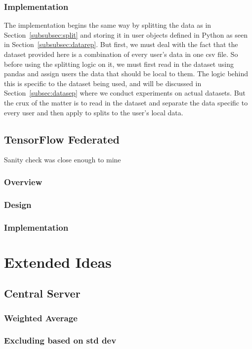 \documentclass[12pt]{article}
\begin{document}
\subsubsection{Implementation}
The implementation begins the same way by splitting the data as in Section~\ref{subsubsec:split} and storing it in user objects defined in Python as seen in Section~\ref{subsubsec:datarep}. But first, we must deal with the fact that the dataset provided here is a combination of every user's data in one csv file. So before using the splitting logic on it, we must first read in the dataset using pandas and assign users the data that should be local to them. The logic behind this is specific to the dataset being used, and will be discussed in Section~\ref{subsec:datasep} where we conduct experiments on actual datasets. But the crux of the matter is to read in the dataset and separate the data specific to every user and then apply to splits to the user's local data.


\subsection{TensorFlow Federated}\label{subsec:tff}
Sanity check was close enough to mine
\subsubsection{Overview}
\subsubsection{Design}
\subsubsection{Implementation}
\clearpage
\section{Extended Ideas}\label{sec:ext-ideas}
\subsection{Central Server}
\subsubsection{Weighted Average}
\subsubsection{Excluding based on std dev}
\end{document}
